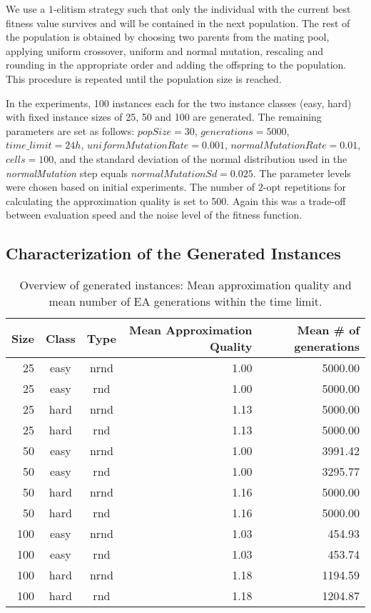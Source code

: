 \documentclass{article}
\begin{document}
We use a $1$-elitism strategy such that only the individual with the
current best fitness value survives and will be contained in the next
population. The rest of the population is obtained by choosing two
parents from the mating pool, applying uniform crossover, uniform and
normal mutation, rescaling and rounding in the appropriate order and
adding the offspring to the population. This procedure is repeated
until the population size is reached.

In the experiments, 100 instances each for the two instance classes
(easy, hard) with fixed instance sizes of 25, 50 and 100 are
generated. The remaining parameters are set as follows:
$\mathit{popSize} = 30$, $generations=5000$, $time\_limit=24h$,
$\mathit{uniformMutationRate} = 0.001$, $\mathit{normalMutationRate} =
0.01$, $cells = 100$, and the standard deviation of the normal
distribution used in the \textit{normalMutation} step equals
$\mathit{normalMutationSd} = 0.025$. The parameter levels were chosen
based on initial experiments. The number of $2$-opt repetitions for
calculating the approximation quality is set to 500. Again this was a
trade-off between evaluation speed and the noise level of the fitness
function.

\subsection{Characterization of the Generated Instances}
\label{sec:charInst}

\begin{table}
  \begin{tabular}{rccrr}
  \toprule
Size & Class & Type & Mean Approximation Quality & Mean \# of generations \\
  \midrule
 25 & easy & nrnd & 1.00 & 5000.00 \\
   25 & easy & rnd & 1.00 & 5000.00 \\
   25 & hard & nrnd & 1.13 & 5000.00 \\
   25 & hard & rnd & 1.13 & 5000.00 \\\midrule
   50 & easy & nrnd & 1.00 & 3991.42 \\
   50 & easy & rnd & 1.00 & 3295.77 \\
   50 & hard & nrnd & 1.16 & 5000.00 \\
   50 & hard & rnd & 1.16 & 5000.00 \\\midrule
  100 & easy & nrnd & 1.03 & 454.93 \\
  100 & easy & rnd & 1.03 & 453.74 \\
  100 & hard & nrnd & 1.18 & 1194.59 \\
  100 & hard & rnd & 1.18 & 1204.87 \\
   \bottomrule
\end{tabular}
   \caption{Overview of generated instances: Mean approximation
    quality and mean number of EA generations within the time limit.}
  \label{tab:qualgen}
\end{table}
\end{document}
